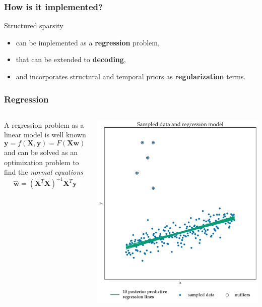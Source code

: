 \documentclass[11pt]{beamer}
\begin{document}
\begin{frame}
  \frametitle{How is it implemented?}
  Structured sparsity
  \begin{itemize}
  \item can be implemented as a \textbf{regression} problem,
  \item that can be extended to \textbf{decoding},
  \item and incorporates structural and temporal priors as
    \textbf{regularization} terms.
  \end{itemize}
\end{frame}
\begin{frame}
  \frametitle{Regression}
  \begin{columns}
    \begin{column}{0.55\linewidth}
      A regression problem as a linear model is well known 
      \[\mathbf{y} = f(\mathbf{X}, \mathbf{y}) = F(\mathbf{Xw}) = \mathbf{Xw}\]
      and can be solved as an optimization problem to find the \emph{normal equations}
      \[\hat{\mathbf{w}} = \left( \mathbf{X}^{T}\mathbf{X}\right)^{-1}\mathbf{X}^{T}\mathbf{y}\]
    \end{column}
    \begin{column}{0.45\linewidth}
      \includegraphics[scale=0.25]{figures/robust_linear_regression_with_outliers.png}
    \end{column}
  \end{columns}
\end{frame}
\end{document}
